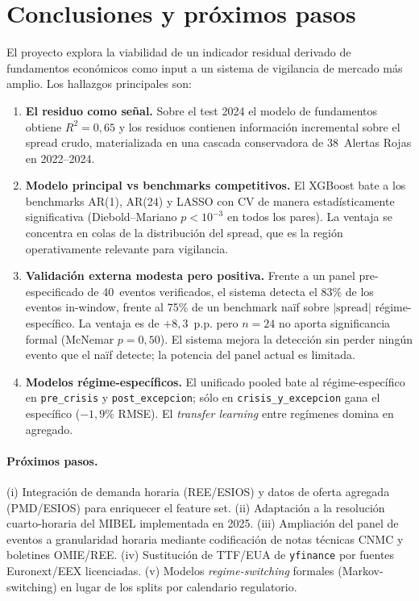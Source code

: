 \documentclass[11pt,a4paper]{article}
\begin{document}
\section{Conclusiones y próximos pasos}

El proyecto explora la viabilidad de un indicador residual derivado de
fundamentos económicos como input a un sistema de vigilancia de mercado
más amplio. Los hallazgos principales son:

\begin{enumerate}
\item \textbf{El residuo como señal.} Sobre el test 2024 el modelo de
fundamentos obtiene $R^2 = 0{,}65$ y los residuos contienen información
incremental sobre el spread crudo, materializada en una cascada
conservadora de 38~Alertas Rojas en 2022--2024.

\item \textbf{Modelo principal vs benchmarks competitivos.} El XGBoost
bate a los benchmarks AR(1), AR(24) y LASSO con CV de manera
estadísticamente significativa (Diebold--Mariano $p < 10^{-3}$ en todos
los pares). La ventaja se concentra en colas de la distribución del
spread, que es la región operativamente relevante para vigilancia.

\item \textbf{Validación externa modesta pero positiva.} Frente a un
panel pre-especificado de 40~eventos verificados, el sistema detecta el
83\% de los eventos in-window, frente al 75\% de un benchmark naïf
sobre $|\mathrm{spread}|$ régime-específico. La ventaja es de
$+8{,}3$~p.p. pero $n=24$ no aporta significancia formal (McNemar
$p = 0{,}50$). El sistema mejora la detección sin perder ningún evento
que el naïf detecte; la potencia del panel actual es limitada.

\item \textbf{Modelos régime-específicos.} El unificado pooled bate al
régime-específico en \texttt{pre\_crisis} y \texttt{post\_excepcion};
sólo en \texttt{crisis\_y\_excepcion} gana el específico ($-1{,}9\%$
RMSE). El \emph{transfer learning} entre regímenes domina en agregado.
\end{enumerate}

\paragraph{Próximos pasos.} (i) Integración de demanda horaria
(REE/ESIOS) y datos de oferta agregada (PMD/ESIOS) para enriquecer el
feature set. (ii) Adaptación a la resolución cuarto-horaria del MIBEL
implementada en 2025. (iii) Ampliación del panel de eventos a
granularidad horaria mediante codificación de notas técnicas CNMC y
boletines OMIE/REE. (iv) Sustitución de TTF/EUA de \texttt{yfinance}
por fuentes Euronext/EEX licenciadas. (v) Modelos
\emph{regime-switching} formales (Markov-switching) en lugar de los
splits por calendario regulatorio.



\end{document}
